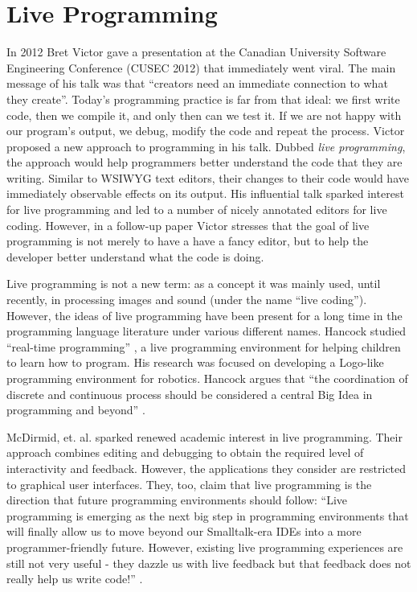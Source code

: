 \section{Live Programming}
\label{sec:live}

In 2012 Bret Victor gave a presentation \cite{bretVictorVideo} at the Canadian University Software Engineering Conference (CUSEC 2012) that immediately went viral. The main message of his talk was that ``creators need an immediate connection to what they create''. Today's programming practice is far from that ideal: we first write code, then we compile it, and only then can we test it. If we are not happy with our program's output, we debug, modify the code and repeat the process. Victor proposed a new approach to programming in his talk. Dubbed  {\emph {live programming}}, the approach would help programmers better understand the code that they are writing. Similar to WSIWYG text editors, their changes to their code would have immediately observable effects on its output. His influential talk sparked interest for live programming and led to a number of nicely annotated editors for live coding. However, in a follow-up paper \cite{victor2012} Victor stresses that the goal of live programming is not merely to have a have a fancy editor, but to help the developer better understand what the code is doing.

Live programming is not a new term: as a concept it was mainly used, until recently, in processing images and sound (under the name ``live coding''). However, the ideas of live programming have been present for a long time in the programming language literature under various different names. Hancock studied ``real-time programming'' \cite{HancockPhDThesis}, a live programming environment for helping children to learn how to program. His research was focused on developing a Logo-like programming environment for robotics. Hancock argues that ``the coordination of discrete and continuous process should be considered a central Big Idea in programming and beyond'' \cite{HancockPhDThesis}.

McDirmid, et. al. \cite{McDirmid13oopsla, BurckhardtFHMMTK13_PLDI, McDirmidE14} sparked renewed academic interest in live programming. Their approach combines editing and debugging to obtain the required level of interactivity and  feedback. However, the applications they consider are restricted to graphical user interfaces. They, too, claim that live programming is the direction that  future programming environments should follow: ``Live programming is emerging as the next big step in programming environments that will finally allow us to move beyond our Smalltalk-era IDEs into a more programmer-friendly future. However, existing live programming experiences are still not very useful - they dazzle us with live feedback but that feedback does not really help us write code!'' \cite{McDirmid13oopsla}.

